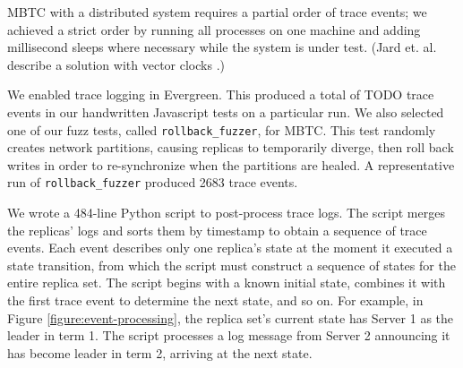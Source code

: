 \documentclass{vldb}
\begin{document}
MBTC with a distributed system requires a partial order of trace events; we achieved a strict order by running all processes on one machine and adding millisecond sleeps where necessary while the system is under test. (Jard et. al. describe a solution with vector clocks \cite{Jard94GeneralApproachToTraceChecking}.)


We enabled trace logging in Evergreen. This produced a total of TODO trace events in our handwritten Javascript tests on a particular run. We also selected one of our fuzz tests, called \texttt{rollback\_fuzzer}, for MBTC. This test randomly creates network partitions, causing replicas to temporarily diverge, then roll back writes in order to re-synchronize when the partitions are healed. A representative run of \texttt{rollback\_fuzzer} produced 2683 trace events.


We wrote a 484-line Python script to post-process trace logs. The script merges the replicas' logs and sorts them by timestamp to obtain a sequence of trace events. Each event describes only one replica's state at the moment it executed a state transition, from which the script must construct a sequence of states for the entire replica set. The script begins with a known initial state, combines it with the first trace event to determine the next state, and so on. For example, in Figure \ref{figure:event-processing}, the replica set's current state has Server 1 as the leader in term 1. The script processes a log message from Server 2 announcing it has become leader in term 2, arriving at the next state.
\end{document}
